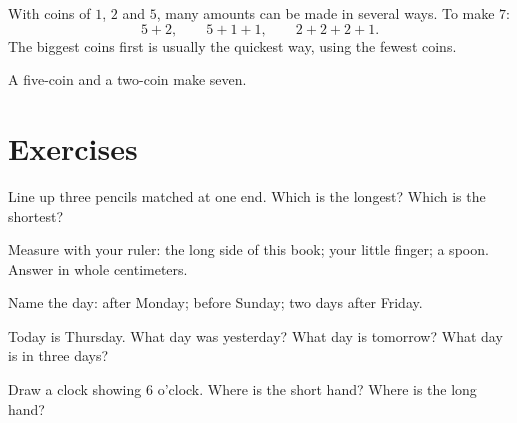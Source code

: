 \begin{example}\label{ex:g1:measure:coins}
With coins of $1$, $2$ and $5$, many amounts can be made in several
ways. To make $7$:
\[
5 + 2, \qquad
5 + 1 + 1, \qquad
2 + 2 + 2 + 1 .
\]
The biggest coins first is usually the quickest way, using the
fewest coins.
\end{example}

\begin{omfigure}

{\small A five-coin and a two-coin make seven.}
\end{omfigure}

\section{Exercises}

\begin{exercise}[$\star$]\label{exo:g1:measure:1}
Line up three pencils matched at one end. Which is the longest?
Which is the shortest?
\end{exercise}

\begin{exercise}[$\star$]\label{exo:g1:measure:2}
Measure with your ruler: the long side of this book; your little
finger; a spoon. Answer in whole centimeters.
\end{exercise}

\begin{exercise}[$\star$]\label{exo:g1:measure:3}
Name the day: after Monday; before Sunday; two days after Friday.
\end{exercise}

\begin{exercise}[$\star$]\label{exo:g1:measure:4}
Today is Thursday. What day was yesterday? What day is tomorrow?
What day is in three days?
\end{exercise}

\begin{exercise}[$\star$]\label{exo:g1:measure:5}
Draw a clock showing $6$ o'clock. Where is the short hand? Where is
the long hand?
\end{exercise}

